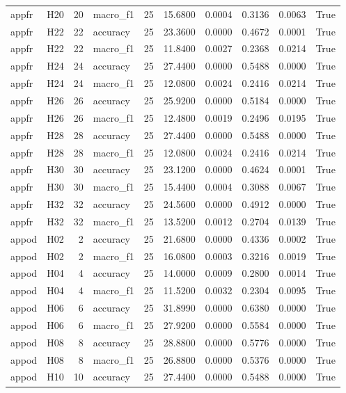\begin{table}[tbp]
\begin{tabular}{llrlrrrrrr}
appfr & H20 & 20 & macro\_f1 & 25 & 15.6800 & 0.0004 & 0.3136 & 0.0063 & True \\
appfr & H22 & 22 & accuracy & 25 & 23.3600 & 0.0000 & 0.4672 & 0.0001 & True \\
appfr & H22 & 22 & macro\_f1 & 25 & 11.8400 & 0.0027 & 0.2368 & 0.0214 & True \\
appfr & H24 & 24 & accuracy & 25 & 27.4400 & 0.0000 & 0.5488 & 0.0000 & True \\
appfr & H24 & 24 & macro\_f1 & 25 & 12.0800 & 0.0024 & 0.2416 & 0.0214 & True \\
appfr & H26 & 26 & accuracy & 25 & 25.9200 & 0.0000 & 0.5184 & 0.0000 & True \\
appfr & H26 & 26 & macro\_f1 & 25 & 12.4800 & 0.0019 & 0.2496 & 0.0195 & True \\
appfr & H28 & 28 & accuracy & 25 & 27.4400 & 0.0000 & 0.5488 & 0.0000 & True \\
appfr & H28 & 28 & macro\_f1 & 25 & 12.0800 & 0.0024 & 0.2416 & 0.0214 & True \\
appfr & H30 & 30 & accuracy & 25 & 23.1200 & 0.0000 & 0.4624 & 0.0001 & True \\
appfr & H30 & 30 & macro\_f1 & 25 & 15.4400 & 0.0004 & 0.3088 & 0.0067 & True \\
appfr & H32 & 32 & accuracy & 25 & 24.5600 & 0.0000 & 0.4912 & 0.0000 & True \\
appfr & H32 & 32 & macro\_f1 & 25 & 13.5200 & 0.0012 & 0.2704 & 0.0139 & True \\
appod & H02 & 2 & accuracy & 25 & 21.6800 & 0.0000 & 0.4336 & 0.0002 & True \\
appod & H02 & 2 & macro\_f1 & 25 & 16.0800 & 0.0003 & 0.3216 & 0.0019 & True \\
appod & H04 & 4 & accuracy & 25 & 14.0000 & 0.0009 & 0.2800 & 0.0014 & True \\
appod & H04 & 4 & macro\_f1 & 25 & 11.5200 & 0.0032 & 0.2304 & 0.0095 & True \\
appod & H06 & 6 & accuracy & 25 & 31.8990 & 0.0000 & 0.6380 & 0.0000 & True \\
appod & H06 & 6 & macro\_f1 & 25 & 27.9200 & 0.0000 & 0.5584 & 0.0000 & True \\
appod & H08 & 8 & accuracy & 25 & 28.8800 & 0.0000 & 0.5776 & 0.0000 & True \\
appod & H08 & 8 & macro\_f1 & 25 & 26.8800 & 0.0000 & 0.5376 & 0.0000 & True \\
appod & H10 & 10 & accuracy & 25 & 27.4400 & 0.0000 & 0.5488 & 0.0000 & True \\

\end{tabular}
\end{table}
